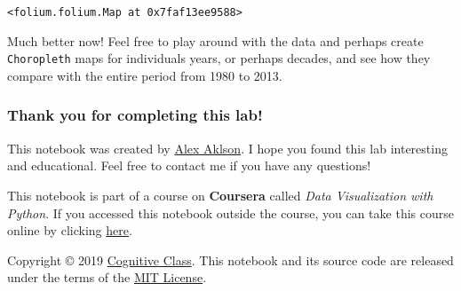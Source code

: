 \documentclass[11pt]{article}
\makeatletter
\newcommand{\boxspacing}{\kern\kvtcb@left@rule\kern\kvtcb@boxsep}
\newcommand{\prompt}[4]{
        \ttfamily\llap{{\color{#2}[#3]:\hspace{3pt}#4}}\vspace{-\baselineskip}
    }
\makeatother
\begin{document}
            \begin{tcolorbox}[breakable, size=fbox, boxrule=.5pt, pad at break*=1mm, opacityfill=0]
\prompt{Out}{outcolor}{33}{\boxspacing}
\begin{Verbatim}[commandchars=\\\{\}]
<folium.folium.Map at 0x7faf13ee9588>
\end{Verbatim}
\end{tcolorbox}
        
    Much better now! Feel free to play around with the data and perhaps
create \texttt{Choropleth} maps for individuals years, or perhaps
decades, and see how they compare with the entire period from 1980 to
2013.

    \hypertarget{thank-you-for-completing-this-lab}{%
\subsubsection{Thank you for completing this
lab!}\label{thank-you-for-completing-this-lab}}

This notebook was created by
\href{https://www.linkedin.com/in/aklson/}{Alex Aklson}. I hope you
found this lab interesting and educational. Feel free to contact me if
you have any questions!

    This notebook is part of a course on \textbf{Coursera} called \emph{Data
Visualization with Python}. If you accessed this notebook outside the
course, you can take this course online by clicking
\href{http://cocl.us/DV0101EN_Coursera_Week3_LAB2}{here}.

    Copyright © 2019
\href{https://cognitiveclass.ai/?utm_source=bducopyrightlink\&utm_medium=dswb\&utm_campaign=bdu}{Cognitive
Class}. This notebook and its source code are released under the terms
of the \href{https://bigdatauniversity.com/mit-license/}{MIT License}.


    
    
    
\end{document}
